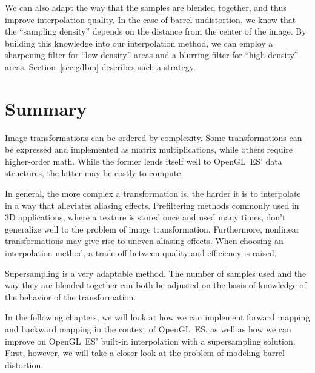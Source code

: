 \documentclass[english,12pt]{ifimaster}
\begin{document}
We can also adapt the way that the samples are blended together, and
thus improve interpolation quality. In the case of barrel
undistortion, we know that the ``sampling density'' depends on the
distance from the center of the image. By building this knowledge into
our interpolation method, we can employ a sharpening filter for
``low-density'' areas and a blurring filter for ``high-density''
areas. Section~\ref{sec:gdbm} describes such a strategy.

\section*{Summary}

Image transformations can be ordered by complexity. Some
transformations can be expressed and implemented as matrix
multiplications, while others require higher-order math. While the
former lends itself well to OpenGL~ES' data structures, the latter may
be costly to compute.

In general, the more complex a transformation is, the harder it is to
interpolate in a way that alleviates aliasing effects. Prefiltering
methods commonly used in 3D applications, where a texture is stored
once and used many times, don't generalize well to the problem of
image transformation. Furthermore, nonlinear transformations may give
rise to uneven aliasing effects. When choosing an interpolation
method, a trade-off between quality and efficiency is raised.

Supersampling is a very adaptable method. The number of samples used
and the way they are blended together can both be adjusted on the
basis of knowledge of the behavior of the transformation.

In the following chapters, we will look at how we can implement
forward mapping and backward mapping in the context of OpenGL~ES, as
well as how we can improve on OpenGL~ES' built-in interpolation with a
supersampling solution. First, however, we will take a closer look at
the problem of modeling barrel distortion.



\end{document}
